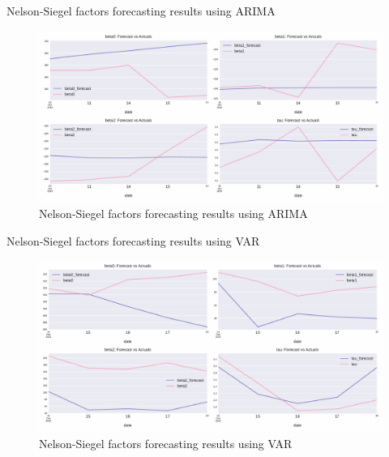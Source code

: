 \documentclass[aspectratio=169]{beamer}
\begin{document}
    \begin{frame}{Nelson-Siegel factors forecasting results using ARIMA}
        \begin{figure}
            \includegraphics[scale=0.47]{fig/ARIMAfcst.pdf}
            \caption{Nelson-Siegel factors forecasting results using ARIMA}
            \label{fig:VARnsfcst}
        \end{figure}
    \end{frame}


    \begin{frame}{Nelson-Siegel factors forecasting results using VAR}
        \begin{figure}
            \includegraphics[scale=0.47]{fig/VARforcasts.pdf}
            \caption{Nelson-Siegel factors forecasting results using VAR}
            \label{fig:VARnsfcst}
        \end{figure}
    \end{frame}
\end{document}
